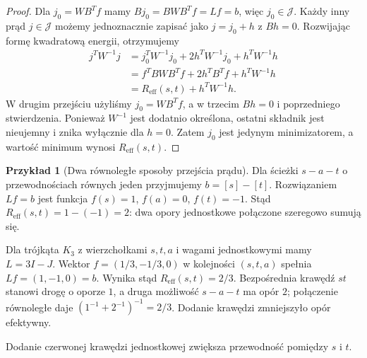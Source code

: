 \documentclass[11pt,a4paper]{report}
\numberwithin{equation}{section}
\theoremstyle{plain}
\theoremstyle{definition}
\newtheorem{przyklad}[twierdzenie]{Przykład}
\theoremstyle{remark}
\begin{document}
\begin{proof}
Dla $j_0=WB^Tf$ mamy
$Bj_0=BWB^Tf=Lf=b$, więc $j_0\in\mathcal J$.
Każdy inny prąd $j\in\mathcal J$ możemy jednoznacznie
zapisać jako $j=j_0+h$ z $Bh=0$.
Rozwijając formę kwadratową energii,
otrzymujemy
\[
\begin{aligned}
 j^TW^{-1}j
 &=j_0^TW^{-1}j_0+2h^TW^{-1}j_0+h^TW^{-1}h\\
 &=f^TBWB^Tf+2h^TB^Tf+h^TW^{-1}h\\
 &=R_{\mathrm{eff}}(s,t)+h^TW^{-1}h.
\end{aligned}
\]
W drugim przejściu użyliśmy $j_0=WB^Tf$,
a w trzecim $Bh=0$ i poprzedniego stwierdzenia.
Ponieważ $W^{-1}$ jest dodatnio określona,
ostatni składnik jest nieujemny i znika wyłącznie
dla $h=0$. Zatem $j_0$ jest jedynym minimizatorem,
a wartość minimum wynosi $R_{\mathrm{eff}}(s,t)$.
\end{proof}

\begin{przyklad}[Dwa równoległe sposoby przejścia prądu]
Dla ścieżki $s-a-t$ o przewodnościach równych jeden
przyjmujemy $b=[s]-[t]$. Rozwiązaniem $Lf=b$
jest funkcja $f(s)=1$, $f(a)=0$, $f(t)=-1$.
Stąd $R_{\mathrm{eff}}(s,t)=1-(-1)=2$:
dwa opory jednostkowe połączone szeregowo sumują się.

Dla trójkąta $K_3$ z wierzchołkami $s,t,a$
i wagami jednostkowymi mamy $L=3I-J$.
Wektor $f=(1/3,-1/3,0)$ w kolejności $(s,t,a)$
spełnia $Lf=(1,-1,0)=b$.
Wynika stąd
$R_{\mathrm{eff}}(s,t)=2/3$.
Bezpośrednia krawędź $st$ stanowi drogę o oporze $1$,
a druga możliwość $s-a-t$ ma opór $2$;
połączenie równoległe daje $(1^{-1}+2^{-1})^{-1}=2/3$.
Dodanie krawędzi zmniejszyło opór efektywny.
\end{przyklad}

\begin{center}

{\footnotesize Dodanie czerwonej krawędzi jednostkowej
zwiększa przewodność pomiędzy $s$ i $t$.}
\end{center}
\end{document}
